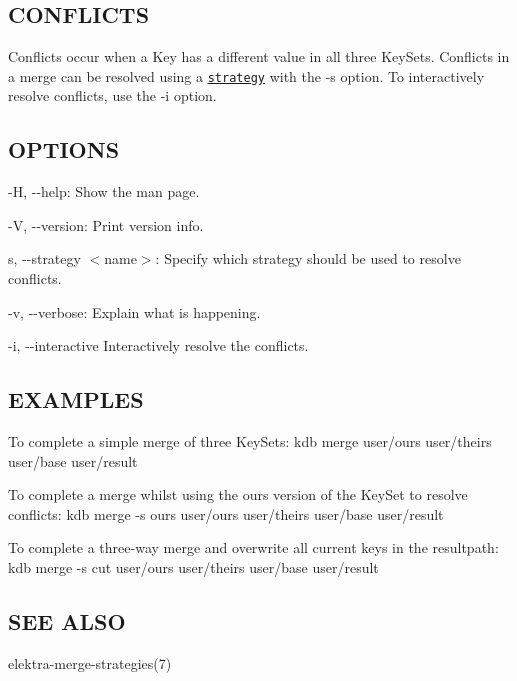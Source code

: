 \subsection*{C\+O\+N\+F\+L\+I\+C\+T\+S}

Conflicts occur when a Key has a different value in all three Key\+Sets. Conflicts in a merge can be resolved using a \href{#STRATEGIES}{\tt strategy} with the {\ttfamily -\/s} option. To interactively resolve conflicts, use the {\ttfamily -\/i} option.

\subsection*{O\+P\+T\+I\+O\+N\+S}


\begin{DoxyItemize}
\item {\ttfamily -\/\+H}, {\ttfamily -\/-\/help}\+: Show the man page.
\item {\ttfamily -\/\+V}, {\ttfamily -\/-\/version}\+: Print version info.
\item {\ttfamily s}, {\ttfamily -\/-\/strategy $<$name$>$}\+: Specify which strategy should be used to resolve conflicts.
\item {\ttfamily -\/v}, {\ttfamily -\/-\/verbose}\+: Explain what is happening.
\item {\ttfamily -\/i}, {\ttfamily -\/-\/interactive} Interactively resolve the conflicts.
\end{DoxyItemize}

\subsection*{E\+X\+A\+M\+P\+L\+E\+S}

To complete a simple merge of three Key\+Sets\+: {\ttfamily kdb merge user/ours user/theirs user/base user/result}

To complete a merge whilst using the {\ttfamily ours} version of the Key\+Set to resolve conflicts\+: {\ttfamily kdb merge -\/s ours user/ours user/theirs user/base user/result}

To complete a three-\/way merge and overwrite all current keys in the {\ttfamily resultpath}\+: {\ttfamily kdb merge -\/s cut user/ours user/theirs user/base user/result}

\subsection*{S\+E\+E A\+L\+S\+O}


\begin{DoxyItemize}
\item elektra-\/merge-\/strategies(7) 
\end{DoxyItemize}